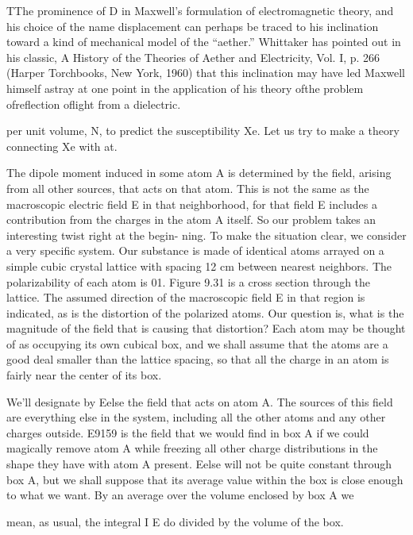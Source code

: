 {{TThe prominence of D in Maxwell's formulation of electromagnetic theory, and his
choice of the name displacement can perhaps be traced to his inclination toward a
kind of mechanical model of the ``aether.'' Whittaker has pointed out in his classic,
A History of the Theories of Aether and Electricity, Vol. I, p. 266 (Harper Torchbooks,
New York, 1960) that this inclination may have led Maxwell himself astray at one
point in the application of his theory ofthe problem ofreflection oflight from a dielectric.

 
 

 

per unit volume, N, to predict the susceptibility Xe. Let us try to
make a theory connecting Xe with at.

The dipole moment induced in some atom A is determined by the
field, arising from all other sources, that acts on that atom. This is
not the same as the macroscopic electric field E in that neighborhood,
for that field E includes a contribution from the charges in the atom A
itself. So our problem takes an interesting twist right at the begin-
ning. To make the situation clear, we consider a very specific system.
Our substance is made of identical atoms arrayed on a simple cubic
crystal lattice with spacing 12 cm between nearest neighbors. The
polarizability of each atom is 01. Figure 9.31 is a cross section
through the lattice. The assumed direction of the macroscopic field
E in that region is indicated, as is the distortion of the polarized
atoms. Our question is, what is the magnitude of the field that is
causing that distortion? Each atom may be thought of as occupying
its own cubical box, and we shall assume that the atoms are a good
deal smaller than the lattice spacing, so that all the charge in an atom
is fairly near the center of its box.

We'll designate by Eelse the field that acts on atom A. The sources
of this field are everything else in the system, including all the other
atoms and any other charges outside. E9159 is the field that we would
find in box A if we could magically remove atom A while freezing all
other charge distributions in the shape they have with atom A
present. Eelse will not be quite constant through box A, but we shall
suppose that its average value within the box is close enough to what
we want. By an average over the volume enclosed by box A we

mean, as usual, the integral I E do divided by the volume of the box.

}}
